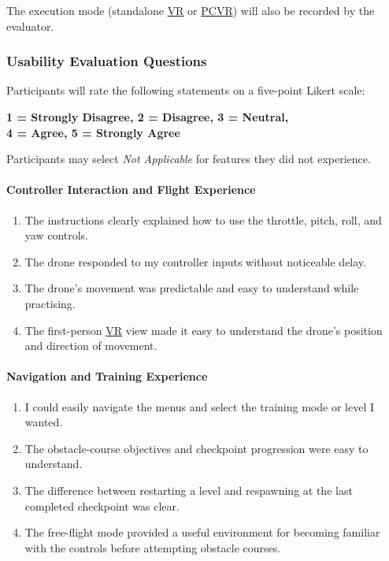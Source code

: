 \documentclass[12pt, titlepage]{article}
\begin{document}
The execution mode (standalone \hyperlink{abbr:VR}{VR} or \hyperlink{abbr:PCVR}{PCVR}) will also be recorded by the evaluator.

\subsubsection{Usability Evaluation Questions}

Participants will rate the following statements on a five-point Likert scale:

\begin{center}
\textbf{1 = Strongly Disagree, 2 = Disagree, 3 = Neutral,}\\
\textbf{4 = Agree, 5 = Strongly Agree}
\end{center}

Participants may select \textit{Not Applicable} for features they did not experience.

\paragraph{Controller Interaction and Flight Experience}

\begin{enumerate}
    \item[\textbf{Q4.}] The instructions clearly explained how to use the throttle, pitch, roll, and yaw controls.

    \item[\textbf{Q5.}] The drone responded to my controller inputs without noticeable delay.

    \item[\textbf{Q6.}] The drone's movement was predictable and easy to understand while practising.

    \item[\textbf{Q7.}] The first-person \hyperlink{abbr:VR}{VR} view made it easy to understand the drone's position and direction of movement.
\end{enumerate}

\paragraph{Navigation and Training Experience}

\begin{enumerate}
    \item[\textbf{Q8.}] I could easily navigate the menus and select the training mode or level I wanted.

    \item[\textbf{Q9.}] The obstacle-course objectives and checkpoint progression were easy to understand.

    \item[\textbf{Q10.}] The difference between restarting a level and respawning at the last completed checkpoint was clear.

    \item[\textbf{Q11.}] The free-flight mode provided a useful environment for becoming familiar with the controls before attempting obstacle courses.
\end{enumerate}
\end{document}
